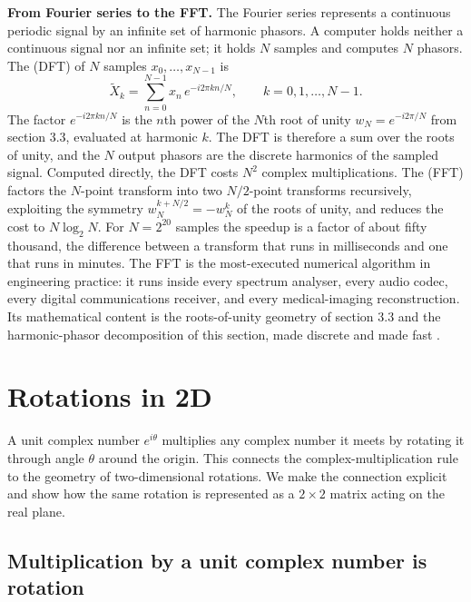\begin{mastery}
\textbf{From Fourier series to the FFT.} The Fourier series
represents a continuous periodic signal by an infinite set of harmonic
phasors. A computer holds neither a continuous signal nor an infinite
set; it holds $N$ samples and computes $N$ phasors. The
 (DFT) of $N$ samples
$x_{0}, \dots, x_{N-1}$ is
\[
\tilde X_{k} = \sum_{n = 0}^{N-1} x_{n}\, e^{-i 2\pi k n / N},
\qquad k = 0, 1, \dots, N-1.
\]
The factor $e^{-i 2\pi k n / N}$ is the $n$th power of the $N$th root
of unity $w_{N} = e^{-i 2\pi / N}$ from section 3.3, evaluated at
harmonic $k$. The DFT is therefore a sum over the roots of unity, and
the $N$ output phasors are the discrete harmonics of the sampled
signal. Computed directly, the DFT costs $N^{2}$ complex
multiplications. The  (FFT) factors
the $N$-point transform into two $N/2$-point transforms recursively,
exploiting the symmetry $w_{N}^{k + N/2} = -w_{N}^{k}$ of the roots of
unity, and reduces the cost to $N\log_{2} N$. For $N = 2^{20}$ samples
the speedup is a factor of about fifty thousand, the difference
between a transform that runs in milliseconds and one that runs in
minutes. The FFT is the most-executed numerical algorithm in
engineering practice: it runs inside every spectrum analyser, every
audio codec, every digital communications receiver, and every
medical-imaging reconstruction. Its mathematical content is the
roots-of-unity geometry of section 3.3 and the harmonic-phasor
decomposition of this section, made discrete and made fast
\cite[chapter 9]{text:oppenheim-schafer}.
\end{mastery}

\section{Rotations in 2D}

A unit complex number $e^{i\theta}$ multiplies any complex number
it meets by rotating it through angle $\theta$ around the origin.
This connects the complex-multiplication rule to the geometry of
two-dimensional rotations. We make the connection explicit and
show how the same rotation is represented as a $2\times 2$ matrix
acting on the real plane.

\subsection{Multiplication by a unit complex number is rotation}

